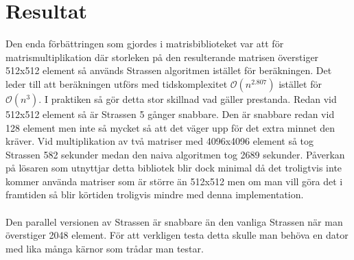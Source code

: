 \section{Resultat}
Den enda förbättringen som gjordes i matrisbiblioteket var att för matrismultiplikation där storleken på den resulterande matrisen överstiger 512x512 element så används Strassen algoritmen istället för beräkningen. Det leder till att beräkningen utförs med tidskomplexitet $\mathcal{O}(n^{2.807})$ istället för $\mathcal{O}(n^{3})$. I praktiken så gör detta stor skillnad vad gäller prestanda. Redan vid 512x512 element så är Strassen 5 gånger snabbare. Den är snabbare redan vid 128 element men inte så mycket så att det väger upp för det extra minnet den kräver. Vid multiplikation av två matriser med 4096x4096 element så tog Strassen 582 sekunder medan den naiva algoritmen tog 2689 sekunder. Påverkan på lösaren som utnyttjar detta bibliotek blir dock minimal då det troligtvis inte kommer använda matriser som är större än 512x512 men om man vill göra det i framtiden så blir körtiden troligvis mindre med denna implementation.
\\
\\
Den parallel versionen av Strassen är snabbare än den vanliga Strassen när man överstiger 2048 element. För att verkligen testa detta skulle man behöva en dator med lika många kärnor som trådar man testar. 
